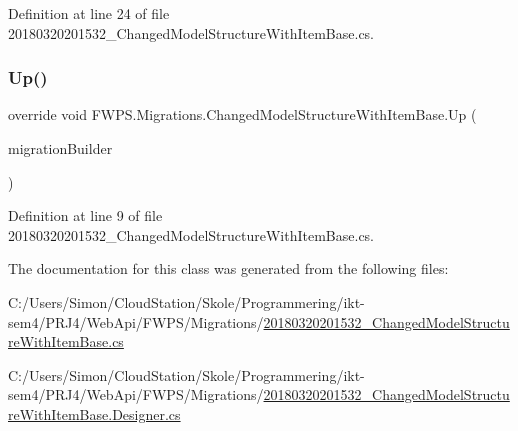 Definition at line 24 of file 20180320201532\+\_\+\+Changed\+Model\+Structure\+With\+Item\+Base.\+cs.

\mbox{\label{class_f_w_p_s_1_1_migrations_1_1_changed_model_structure_with_item_base_ac9fc1354c61774fbf43f81f98570dd77}} 
\subsubsection{\texorpdfstring{Up()}{Up()}}
{\footnotesize\ttfamily override void F\+W\+P\+S.\+Migrations.\+Changed\+Model\+Structure\+With\+Item\+Base.\+Up (\begin{DoxyParamCaption}\item[{Migration\+Builder}]{migration\+Builder }\end{DoxyParamCaption})\hspace{0.3cm}{\ttfamily [protected]}}



Definition at line 9 of file 20180320201532\+\_\+\+Changed\+Model\+Structure\+With\+Item\+Base.\+cs.



The documentation for this class was generated from the following files\+:\begin{DoxyCompactItemize}
\item 
C\+:/\+Users/\+Simon/\+Cloud\+Station/\+Skole/\+Programmering/ikt-\/sem4/\+P\+R\+J4/\+Web\+Api/\+F\+W\+P\+S/\+Migrations/\mbox{\hyperlink{20180320201532___changed_model_structure_with_item_base_8cs}{20180320201532\+\_\+\+Changed\+Model\+Structure\+With\+Item\+Base.\+cs}}\item 
C\+:/\+Users/\+Simon/\+Cloud\+Station/\+Skole/\+Programmering/ikt-\/sem4/\+P\+R\+J4/\+Web\+Api/\+F\+W\+P\+S/\+Migrations/\mbox{\hyperlink{20180320201532___changed_model_structure_with_item_base_8_designer_8cs}{20180320201532\+\_\+\+Changed\+Model\+Structure\+With\+Item\+Base.\+Designer.\+cs}}\end{DoxyCompactItemize}
